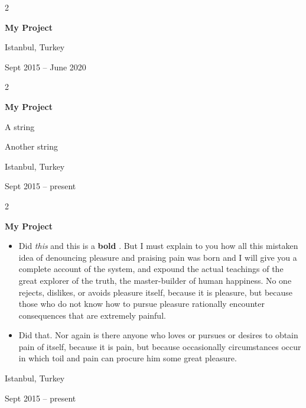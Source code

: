 \documentclass[10pt, letterpaper]{article}
\newenvironment{summary}{
    \begin{description}[
        topsep=0.10 cm,
        parsep=0.10 cm,
        partopsep=0pt,
        itemsep=0pt,
        leftmargin=0.4 cm + 10pt
    ]
}{
    \end{description}
} %
\newenvironment{highlights}{
    \begin{itemize}[
        topsep=0.10 cm,
        parsep=0.10 cm,
        partopsep=0pt,
        itemsep=0pt,
        leftmargin=0.4 cm + 10pt
    ]
}{
    \end{itemize}
} %
\newenvironment{twocolentry}[2][]{
    \onecolentry
    \def\secondColumn{#2}
    \setcolumnwidth{\fill, 4.5 cm}
    \begin{paracol}{2}
}{
    \switchcolumn \raggedleft \secondColumn
    \end{paracol}
    \endonecolentry
} %
\let\hrefWithoutArrow\href
\renewcommand{\href}[2]{\hrefWithoutArrow{#1}{\ifthenelse{\equal{#2}{}}{ }{#2 }\raisebox{.15ex}{\footnotesize \faExternalLink*}}}
\begin{document}
        \vspace{0.2 cm}

        \begin{twocolentry}{
            Istanbul, Turkey

        Sept 2015 – June 2020
        }
            \textbf{My Project}
        \end{twocolentry}


        \vspace{0.2 cm}

        \begin{twocolentry}{
            Istanbul, Turkey

        Sept 2015 – present
        }
            \textbf{My Project}
            \begin{summary}
                \item A string
                \item Another string
            \end{summary}
        \end{twocolentry}


        \vspace{0.2 cm}

        \begin{twocolentry}{
            Istanbul, Turkey

        Sept 2015 – present
        }
            \textbf{My Project}
            \begin{highlights}
                \item Did \textit{this} and this is a \textbf{bold} \href{https://example.com}{link}. But I must explain to you how all this mistaken idea of denouncing pleasure and praising pain was born and I will give you a complete account of the system, and expound the actual teachings of the great explorer of the truth, the master-builder of human happiness. No one rejects, dislikes, or avoids pleasure itself, because it is pleasure, but because those who do not know how to pursue pleasure rationally encounter consequences that are extremely painful.
                \item Did that. Nor again is there anyone who loves or pursues or desires to obtain pain of itself, because it is pain, but because occasionally circumstances occur in which toil and pain can procure him some great pleasure.
            \end{highlights}
        \end{twocolentry}


        \vspace{0.2 cm}
\end{document}
